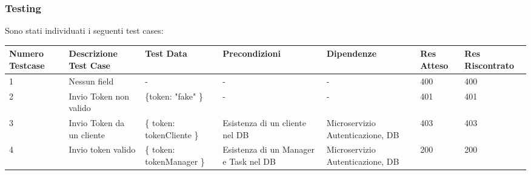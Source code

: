\documentclass{report}
\begin{document}
\subsubsection*{Testing}

Sono stati individuati i seguenti test cases:
\begin{center} %
	\centering
	\begin{tabular}{ |p{1cm}|p{2cm}|p{2cm}|p{2cm}|p{2cm}|p{1cm}|p{1cm}| }
		\hline
		Numero Testcase & Descrizione Test Case & Test Data & Precondizioni & Dipendenze & Res Atteso & Res Riscontrato \\
		\hline
		1 & Nessun field & - & - & - & 400 & 400 \\
		\hline
		2 & Invio Token non valido & \{token: "fake" \} & - & - & 401 & 401 \\
		\hline
		3 & Invio Token da un cliente & \{ token: tokenCliente \} & Esistenza di un cliente nel DB & Microservizio Autenticazione, DB & 403 & 403 \\
		\hline
		4 & Invio token valido & \{ token: tokenManager \} & Esistenza di un Manager e Task nel DB & Microservizio Autenticazione, DB & 200 & 200 \\
		\hline
	\end{tabular}
\end{center}
\end{document}
